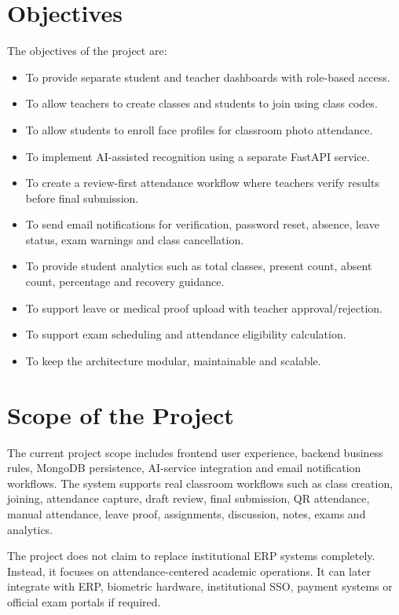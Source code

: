 \section{Objectives}
The objectives of the project are:
\begin{itemize}
    \item To provide separate student and teacher dashboards with role-based access.
    \item To allow teachers to create classes and students to join using class codes.
    \item To allow students to enroll face profiles for classroom photo attendance.
    \item To implement AI-assisted recognition using a separate FastAPI service.
    \item To create a review-first attendance workflow where teachers verify results before final submission.
    \item To send email notifications for verification, password reset, absence, leave status, exam warnings and class cancellation.
    \item To provide student analytics such as total classes, present count, absent count, percentage and recovery guidance.
    \item To support leave or medical proof upload with teacher approval/rejection.
    \item To support exam scheduling and attendance eligibility calculation.
    \item To keep the architecture modular, maintainable and scalable.
\end{itemize}

\section{Scope of the Project}
The current project scope includes frontend user experience, backend business rules, MongoDB persistence, AI-service integration and email notification workflows. The system supports real classroom workflows such as class creation, joining, attendance capture, draft review, final submission, QR attendance, manual attendance, leave proof, assignments, discussion, notes, exams and analytics.

The project does not claim to replace institutional ERP systems completely. Instead, it focuses on attendance-centered academic operations. It can later integrate with ERP, biometric hardware, institutional SSO, payment systems or official exam portals if required.

